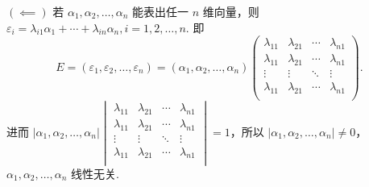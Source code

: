 \begin{exercise}
\begin{exgroup}
\begin{answer}
            $(\impliedby)$ 若 $\alpha_1, \alpha_2, \ldots, \alpha_n$ 能表出任一 $n$ 维向量，则 $\varepsilon_i = \lambda_{i1}\alpha_1+\cdots+\lambda_{in}\alpha_n, i = 1, 2, \ldots, n$. 即
            \[E = (\varepsilon_1, \varepsilon_2, \ldots, \varepsilon_n) = (\alpha_1, \alpha_2, \ldots, \alpha_n)\begin{pmatrix}
                    \lambda_{11} & \lambda_{21} & \cdots & \lambda_{n1} \\
                    \lambda_{11} & \lambda_{21} & \cdots & \lambda_{n1} \\
                    \vdots       & \vdots       & \ddots & \vdots       \\
                    \lambda_{11} & \lambda_{21} & \cdots & \lambda_{n1} \\
                \end{pmatrix}.\]
            进而 $\lvert \alpha_1, \alpha_2, \ldots, \alpha_n \rvert \begin{vmatrix}
                    \lambda_{11} & \lambda_{21} & \cdots & \lambda_{n1} \\
                    \lambda_{11} & \lambda_{21} & \cdots & \lambda_{n1} \\
                    \vdots       & \vdots       & \ddots & \vdots       \\
                    \lambda_{11} & \lambda_{21} & \cdots & \lambda_{n1} \\
                \end{vmatrix} = 1$，所以 $\lvert \alpha_1, \alpha_2, \ldots, \alpha_n \rvert \neq 0$，$\alpha_1, \alpha_2, \ldots, \alpha_n$ 线性无关.
        \end{answer}


\end{exgroup}
\end{exercise}
